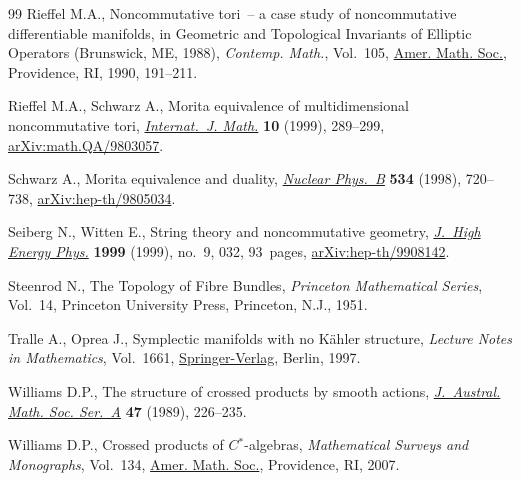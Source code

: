 \documentclass[10pt,a4paper]{amsart}
\numberwithin{equation}{section}
\begin{document}
\begin{thebibliography}{99}
Rieffel M.A., Noncommutative tori~-- a case study of noncommutative
 differentiable manifolds, in Geometric and Topological Invariants of Elliptic
 Operators ({B}runswick, {ME}, 1988), \textit{Contemp. Math.}, Vol.~105, \href{https://doi.org/10.1090/conm/105/1047281}{Amer.
 Math. Soc.}, Providence, RI, 1990, 191--211.

Rieffel M.A., Schwarz A., Morita equivalence of multidimensional noncommutative
 tori, \href{https://doi.org/10.1142/S0129167X99000100}{\textit{Internat.~J. Math.}} \textbf{10} (1999), 289--299,
 \href{https://arxiv.org/abs/math.QA/9803057}{arXiv:math.QA/9803057}.

Schwarz A., Morita equivalence and duality, \href{https://doi.org/10.1016/S0550-3213(98)00550-1}{\textit{Nuclear Phys.~B}}
 \textbf{534} (1998), 720--738, \href{https://arxiv.org/abs/hep-th/9805034}{arXiv:hep-th/9805034}.

Seiberg N., Witten E., String theory and noncommutative geometry,
 \href{https://doi.org/10.1088/1126-6708/1999/09/032}{\textit{J.~High Energy Phys.}} \textbf{1999} (1999), no.~9, 032, 93~pages,
 \href{https://arxiv.org/abs/hep-th/9908142}{arXiv:hep-th/9908142}.

Steenrod N., The {T}opology of {F}ibre {B}undles, \textit{Princeton Mathematical
 Series}, Vol.~14, Princeton University Press, Princeton, N.J., 1951.

Tralle A., Oprea J., Symplectic manifolds with no {K}\"ahler structure,
 \textit{Lecture Notes in Mathematics}, Vol.~1661, \href{https://doi.org/10.1007/BFb0092608}{Springer-Verlag}, Berlin,
 1997.

Williams D.P., The structure of crossed products by smooth actions,
 \href{https://doi.org/10.1017/S1446788700031657}{\textit{J.~Austral. Math. Soc. Ser.~A}} \textbf{47} (1989), 226--235.

Williams D.P., Crossed products of {$C{^\ast}$}-algebras, \textit{Mathematical
 Surveys and Monographs}, Vol.~134, \href{https://doi.org/10.1090/surv/134}{Amer. Math. Soc.}, Providence, RI, 2007.

\end{thebibliography}
\end{document}
